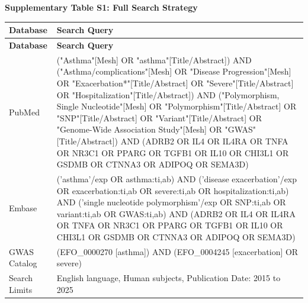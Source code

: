 \documentclass[11pt,a4paper]{article}
\begin{document}
\noindent\textbf{Supplementary Table S1: Full Search Strategy}
\small\begin{center}\begin{longtable}{@{}p{2.5cm}p{11.5cm}@{}}
\toprule
\textbf{Database} & \textbf{Search Query} \\
\midrule
\endfirsthead
\midrule
\textbf{Database} & \textbf{Search Query} \\
\midrule
\endhead
\bottomrule
\endfoot
\bottomrule
\endlastfoot
PubMed & ("Asthma"[Mesh] OR "asthma"[Title/Abstract]) AND ("Asthma/complications"[Mesh] OR "Disease Progression"[Mesh] OR "Exacerbation*"[Title/Abstract] OR "Severe"[Title/Abstract] OR "Hospitalization"[Title/Abstract]) AND ("Polymorphism, Single Nucleotide"[Mesh] OR "Polymorphism"[Title/Abstract] OR "SNP"[Title/Abstract] OR "Variant"[Title/Abstract] OR "Genome-Wide Association Study"[Mesh] OR "GWAS"[Title/Abstract]) AND (ADRB2 OR IL4 OR IL4RA OR TNFA OR NR3C1 OR PPARG OR TGFB1 OR IL10 OR CHI3L1 OR GSDMB OR CTNNA3 OR ADIPOQ OR SEMA3D) \\
\midrule
Embase & ('asthma'/exp OR asthma:ti,ab) AND ('disease exacerbation'/exp OR exacerbation:ti,ab OR severe:ti,ab OR hospitalization:ti,ab) AND ('single nucleotide polymorphism'/exp OR SNP:ti,ab OR variant:ti,ab OR GWAS:ti,ab) AND (ADRB2 OR IL4 OR IL4RA OR TNFA OR NR3C1 OR PPARG OR TGFB1 OR IL10 OR CHI3L1 OR GSDMB OR CTNNA3 OR ADIPOQ OR SEMA3D) \\
\midrule
GWAS Catalog & (EFO\_0000270 [asthma]) AND (EFO\_0004245 [exacerbation] OR severe) \\
\midrule
Search Limits & English language, Human subjects, Publication Date: 2015 to 2025 \\
\end{longtable}\end{center}
\end{document}

